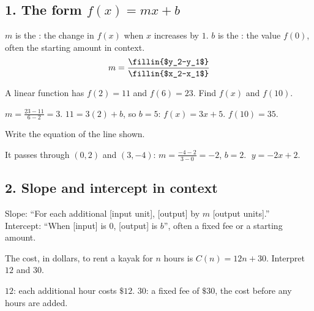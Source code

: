 
\subsection*{1. The form $f(x)=mx+b$}
\begin{keyidea}
$m$ is the : the change in $f(x)$ when $x$ increases by $1$. $b$ is the : the value $f(0)$, often the starting amount in context.
\[m=\frac{\fillin{$y_2-y_1$}}{\fillin{$x_2-x_1$}}\]
\end{keyidea}

A linear function has $f(2)=11$ and $f(6)=23$. Find $f(x)$ and $f(10)$.
\begin{workspace}[2.4cm]
$m=\frac{23-11}{6-2}=3$. $11=3(2)+b$, so $b=5$: $f(x)=3x+5$. $f(10)=35$.
\end{workspace}

Write the equation of the line shown.
\begin{workspace}[2cm]
It passes through $(0,2)$ and $(3,-4)$: $m=\frac{-4-2}{3-0}=-2$, $b=2$. $\;y=-2x+2$.
\end{workspace}

\subsection*{2. Slope and intercept in context}
\begin{keyidea}[Template]
Slope: ``For each additional [input unit], [output]  by $m$ [output units].''\\
Intercept: ``When [input] is $0$, [output] is $b$'', often a fixed fee or a starting amount.
\end{keyidea}

The cost, in dollars, to rent a kayak for $n$ hours is $C(n)=12n+30$. Interpret $12$ and $30$.
\begin{workspace}[2cm]
$12$: each additional hour costs $\$12$. \quad $30$: a fixed fee of $\$30$, the cost before any hours are added.
\end{workspace}

